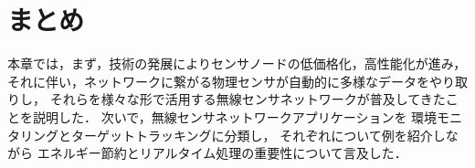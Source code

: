 



\section{まとめ}
本章では，まず，技術の発展によりセンサノードの低価格化，高性能化が進み，
それに伴い，ネットワークに繋がる物理センサが自動的に多様なデータをやり取りし，
それらを様々な形で活用する無線センサネットワークが普及してきたことを説明した．
次いで，無線センサネットワークアプリケーションを
環境モニタリングとターゲットトラッキングに分類し，
それぞれについて例を紹介しながら
エネルギー節約とリアルタイム処理の重要性について言及した．

